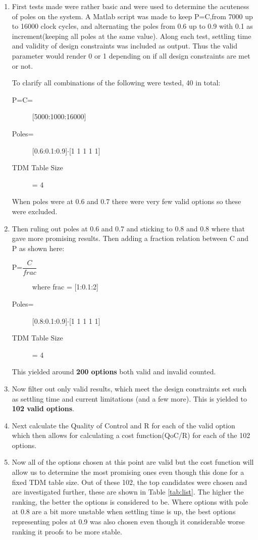 \begin{enumerate}
	\item First tests made were rather basic and were used to determine the acuteness of poles on the system. A Matlab script was made to keep P=C,from 7000 up to 16000 clock cycles, and alternating the poles from 0.6 up to 0.9 with 0.1 as increment(keeping all poles at the same value). Along each test, settling time and validity of design constraints was included as output. Thus the valid parameter would render 0 or 1 depending on if all design constraints are met or not.
	
	To clarify all combinations of the following were tested, 40 in total:
	\begin{description}
		\item[P=C=] [5000:1000:16000]
		\item[Poles=] [0.6:0.1:0.9]$\cdot$[1 1 1 1 1]
		\item[TDM Table Size] = 4
	\end{description}
	When poles were at 0.6 and 0.7 there were very few valid options so these were excluded.
	
	\item Then ruling out poles at 0.6 and 0.7 and sticking to 0.8 and 0.8 where that gave more promising results. Then adding a fraction relation between C and P as shown here:
		\begin{description}
			\item[P=$\dfrac{C}{frac}$] where frac = [1:0.1:2]
			\item[Poles=] [0.8:0.1:0.9]$\cdot$[1 1 1 1 1]
			\item[TDM Table Size] = 4
		\end{description}
	This yielded around \textbf{200 options} both valid and invalid counted.
	\item Now filter out only valid results, which meet the design constraints set such as settling time and current limitations (and a few more). This is yielded to \textbf{102 valid options}.
	\item Next calculate the Quality of Control and R for each of the valid option which then allows for calculating a cost function(QoC/R) for each of the 102 options.
	\item Now all of the options chosen at this point are valid but the cost function will allow us to determine the most promising ones even though this done for a fixed TDM table size. Out of these 102, the top candidates were chosen and are investigated further, these are shown in Table \ref{tab:list}. The higher the ranking, the better the options is considered to be. Where options with pole at 0.8 are a bit more unstable when settling time is up, the best options representing poles at 0.9 was also chosen even though it considerable worse ranking it proofs to be more stable.
	

\end{enumerate}
